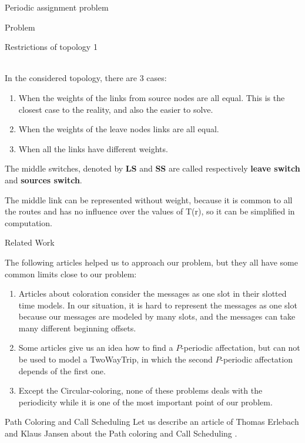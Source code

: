 \documentclass[a4paper,10pt]{report}
\begin{document}
\begin{chapter}{Periodic assignment problem}
\begin{section}{Problem}
\begin{subsection}{Restrictions of topology 1}
{{\begin{figure}[H]
\begin{center}
\end{center}
\end{figure}
}}\\


In the considered topology, there are 3 cases:
\begin{enumerate}
 \item When the weights of the links from source nodes are all equal. This is the closest case to the reality, and also the easier to solve.
 \item When the weights of the leave nodes links are all equal.
 \item When all the links have different weights.
\end{enumerate}

The middle switches, denoted by {\bf LS} and {\bf SS} are called respectively {\bf leave switch} and {\bf sources switch}.

The middle link can be represented without weight, because it is common to all the routes and has no influence over the values of T(r), so it can be simplified in computation. 

\end{subsection}
\end{section}
\begin{section}{Related Work}

The following articles helped us to approach our problem, but they all have some common limits close to our problem:
\begin{enumerate}
 \item Articles about coloration consider the messages as one slot in their slotted time models. In our situation, it is hard to represent the messages as one slot because our messages are modeled by many slots, and the messages can take many different beginning offsets.
 \item Some articles give us an idea how to find a $P$-periodic affectation, but can not be used to model a TwoWayTrip, in which the second $P$-periodic affectation depends of the first one.
 \item Except the Circular-coloring, none of these problems deals with the periodicity while it is one of the most important point of our problem.
 
\end{enumerate}

\begin{subsection}{Path Coloring and Call Scheduling}
Let us describe an article of Thomas Erlebach and Klaus Jansen about the Path coloring and Call Scheduling \cite{erlebach2001complexity}.


\end{subsection}
\end{section}
\end{chapter}
\end{document}
